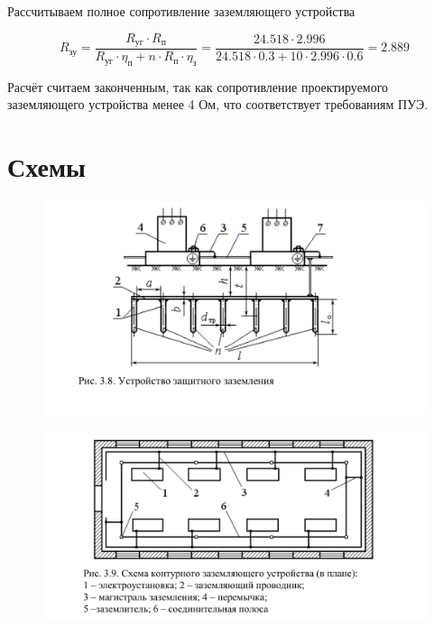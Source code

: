 Рассчитываем полное сопротивление заземляющего устройства

\[
R_\text{зу} = \frac{R_\text{уг} \cdot R_\text{п}}{R_\text{уг} \cdot \eta_\text{п} + n\cdot R_\text{п} \cdot \eta_\text{з}}= \frac{24.518 \cdot 2.996}{24.518 \cdot 0.3 + 10 \cdot 2.996 \cdot 0.6} = 2.889
\]

Расчёт считаем законченным, так как сопротивление проектируемого заземляющего устройства менее 4 Ом, что соответствует требованиям ПУЭ.

\section{Схемы}

\begin{figure}
	\centering
	\includegraphics[width=\textwidth]{images/1.png}
\end{figure}

\begin{figure}
	\centering
	\includegraphics[width=\textwidth]{images/2.png}
\end{figure}

